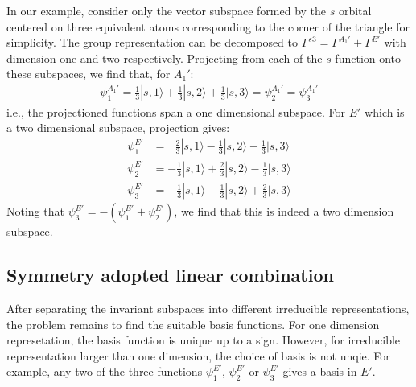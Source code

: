 \documentclass{article}
\begin{document}
In our example, consider only the vector subspace formed by the $s$ orbital centered on three equivalent atoms 
corresponding to the corner of the triangle for simplicity. 
The group representation can be decomposed to $\Gamma^{s3} = \Gamma^{A_1'} + \Gamma^{E'}$ 
with dimension one and two respectively. 
Projecting from each of the $s$ function onto these subspaces, we find that, for $A_1'$:
\begin{align}
    \psi_1^{A_1'} = \frac{1}{3}|s,1\rangle + \frac{1}{3}|s,2\rangle + \frac{1}{3}|s,3\rangle 
    = \psi_2^{A_1'} = \psi_3^{A_1'}
\end{align}
i.e., the projectioned functions span a one dimensional subspace. 
For $E'$ which is a two dimensional subspace, projection gives:
\begin{align}
    \psi_1^{E'} &= \ \ \ \frac{2}{3}|s,1\rangle - \frac{1}{3}|s,2\rangle - \frac{1}{3}|s,3\rangle  \\
    \psi_2^{E'} &= -\frac{1}{3}|s,1\rangle + \frac{2}{3}|s,2\rangle - \frac{1}{3}|s,3\rangle  \\
    \psi_3^{E'} &= -\frac{1}{3}|s,1\rangle - \frac{1}{3}|s,2\rangle + \frac{2}{3}|s,3\rangle 
\end{align}
Noting that $\psi_3^{E'} = - (\psi_1^{E'} + \psi_2^{E'})$, we find that this is indeed a two dimension 
subspace. 

\subsection{Symmetry adopted linear combination}
After separating the invariant subspaces into different irreducible representations, the problem remains to 
find the suitable basis functions. For one dimension represetation, the basis function is unique up to a sign.
However, for irreducible representation larger than one dimension, the choice of basis is not unqie. 
For example, any two of the three functions $\psi_1^{E'}$, $\psi_2^{E'}$ or $\psi_3^{E'}$ gives a basis in $E'$. 
\end{document}
